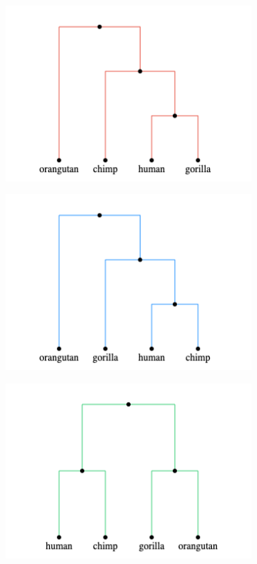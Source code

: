 \documentclass{article}
\begin{document}
\begin{figure}[H]
\begin{minipage}{.48\textwidth}
\begin{minipage}{.4\textwidth}
\begin{subfigure}[b]{\linewidth}
            \end{subfigure}
            \begin{subfigure}[b]{\linewidth}
                \includegraphics[scale=0.3]{tree_1.png}
            \end{subfigure}
        \end{minipage}
        \begin{minipage}{.4\textwidth}
            \begin{subfigure}[b]{\linewidth}
                \includegraphics[scale=0.3]{tree_2.png}
            \end{subfigure}
            \begin{subfigure}[b]{\linewidth}
                \includegraphics[scale=0.3]{tree_3.png}

\end{subfigure}
\end{minipage}
\end{minipage}
\end{figure}
\end{document}
